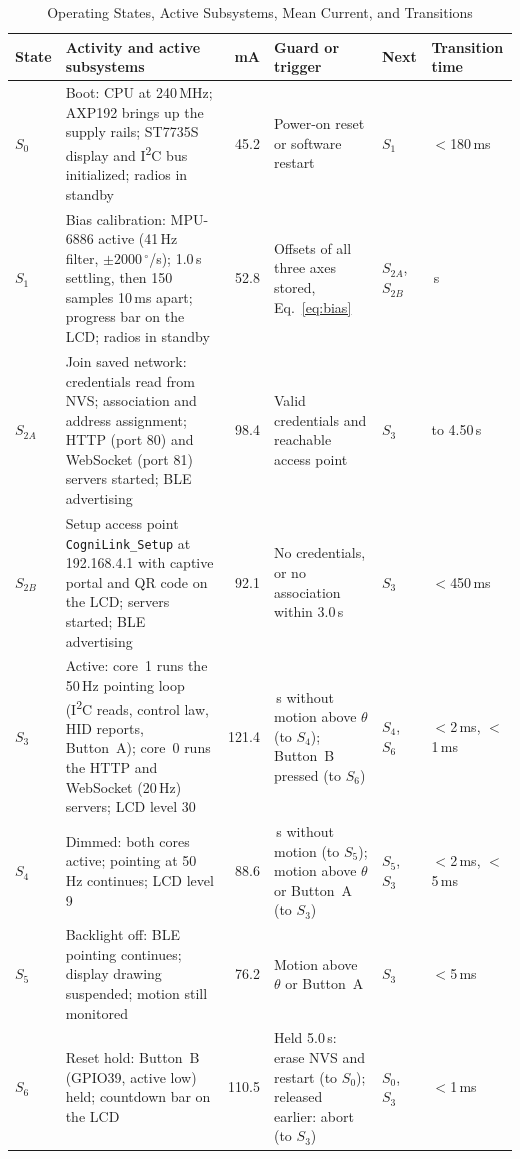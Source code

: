 \documentclass[journal]{IEEEtran}
\newcommand{\dps}{\ensuremath{^{\circ}}/s}
\begin{document}
\begin{table}[!t]
\caption{Operating States, Active Subsystems, Mean Current, and Transitions}
\label{tab:states}
\centering
\footnotesize
\renewcommand{\arraystretch}{1.15}
\setlength{\tabcolsep}{3.5pt}
\begin{tabular}{@{}l>{\raggedright\arraybackslash}p{6.4cm}r>{\raggedright\arraybackslash}p{4.6cm}l>{\raggedright\arraybackslash}p{1.9cm}@{}}
\toprule
State & Activity and active subsystems & mA & Guard or trigger & Next & Transition time \\
\midrule
$S_0$ & Boot: CPU at 240\,MHz; AXP192 brings up the supply rails; ST7735S display and I\textsuperscript{2}C bus initialized; radios in standby & 45.2 & Power-on reset or software restart & $S_1$ & $<$180\,ms \\
$S_1$ & Bias calibration: MPU-6886 active (41\,Hz filter, $\pm2000$\,\dps); 1.0\,s settling, then 150 samples 10\,ms apart; progress bar on the LCD; radios in standby & 52.8 & Offsets of all three axes stored, Eq.~\eqref{eq:bias} & $S_{2A}$, $S_{2B}$ & 2.50\,s \\
$S_{2A}$ & Join saved network: credentials read from NVS; association and address assignment; HTTP (port 80) and WebSocket (port 81) servers started; BLE advertising & 98.4 & Valid credentials and reachable access point & $S_3$ & 1.20 to 4.50\,s \\
$S_{2B}$ & Setup access point \texttt{CogniLink\_Setup} at 192.168.4.1 with captive portal and QR code on the LCD; servers started; BLE advertising & 92.1 & No credentials, or no association within 3.0\,s & $S_3$ & $<$450\,ms \\
$S_3$ & Active: core~1 runs the 50\,Hz pointing loop (I\textsuperscript{2}C reads, control law, HID reports, Button~A); core~0 runs the HTTP and WebSocket (20\,Hz) servers; LCD level 30 & 121.4 & 30\,s without motion above $\theta$ (to $S_4$); Button~B pressed (to $S_6$) & $S_4$, $S_6$ & $<$2\,ms, $<$1\,ms \\
$S_4$ & Dimmed: both cores active; pointing at 50\,Hz continues; LCD level 9 & 88.6 & 60\,s without motion (to $S_5$); motion above $\theta$ or Button~A (to $S_3$) & $S_5$, $S_3$ & $<$2\,ms, $<$5\,ms \\
$S_5$ & Backlight off: BLE pointing continues; display drawing suspended; motion still monitored & 76.2 & Motion above $\theta$ or Button~A & $S_3$ & $<$5\,ms \\
$S_6$ & Reset hold: Button~B (GPIO39, active low) held; countdown bar on the LCD & 110.5 & Held 5.0\,s: erase NVS and restart (to $S_0$); released earlier: abort (to $S_3$) & $S_0$, $S_3$ & $<$1\,ms \\
\bottomrule
\end{tabular}
\end{table}
\end{document}
